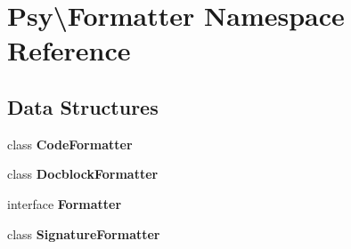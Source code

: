 \section{Psy\textbackslash{}Formatter Namespace Reference}
\label{namespace_psy_1_1_formatter}
\subsection*{Data Structures}
\begin{DoxyCompactItemize}
\item 
class {\bf Code\+Formatter}
\item 
class {\bf Docblock\+Formatter}
\item 
interface {\bf Formatter}
\item 
class {\bf Signature\+Formatter}
\end{DoxyCompactItemize}
